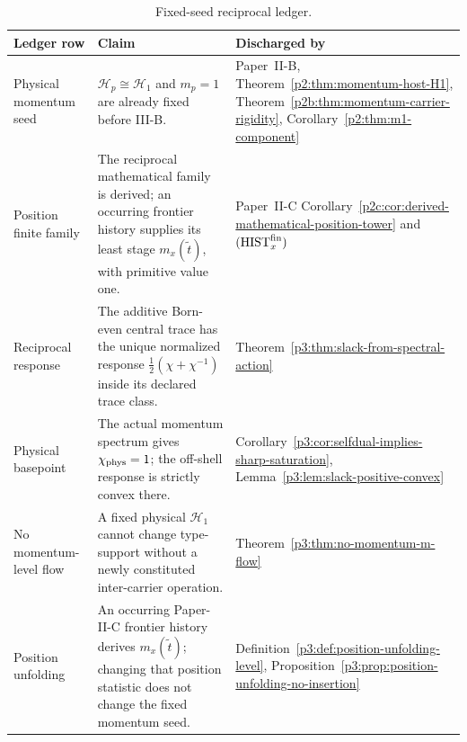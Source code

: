 \documentclass[12pt,a4paper]{article}
\begin{document}
\begin{table}[H]
\centering
\small
\begingroup
\setlength{\tabcolsep}{3pt}
\renewcommand{\arraystretch}{1.15}
\begin{tabular}{@{}L{3.0cm}L{8.0cm}L{\dimexpr\linewidth-11.0cm-4\tabcolsep\relax}@{}}
\toprule
\textbf{Ledger row}&\textbf{Claim}&\textbf{Discharged by}\\
\midrule
Physical momentum seed
& \(\mathcal H_p\cong\mathcal H_1\) and \(m_p=1\) are already fixed before III-B.
& Paper~II-B, Theorem~\ref{p2:thm:momentum-host-H1},
  Theorem~\ref{p2b:thm:momentum-carrier-rigidity},
  Corollary~\ref{p2:thm:m1-component}\\
Position finite family
& The reciprocal mathematical family is derived; an occurring frontier
history supplies its least stage \(m_x(\widetilde t)\), with primitive value
one.
& Paper~II-C
Corollary~\ref{p2c:cor:derived-mathematical-position-tower} and
\((\mathrm{HIST}_x^{\rm fin})\)\\
Reciprocal response
& The additive Born-even central trace has the unique normalized response \(\tfrac12(\chi+\chi^{-1})\) inside its declared trace class.
& Theorem~\ref{p3:thm:slack-from-spectral-action}\\
Physical basepoint
& The actual momentum spectrum gives \(\chi_{\rm phys}=1\); the off-shell response is strictly convex there.
& Corollary~\ref{p3:cor:selfdual-implies-sharp-saturation}, Lemma~\ref{p3:lem:slack-positive-convex}\\
No momentum-level flow
& A fixed physical \(\mathcal H_1\) cannot change type-support without a newly constituted inter-carrier operation.
& Theorem~\ref{p3:thm:no-momentum-m-flow}\\
Position unfolding
& An occurring Paper-II-C frontier history derives
\(m_x(\widetilde t)\); changing that position statistic does not change the
fixed momentum seed.
& Definition~\ref{p3:def:position-unfolding-level}, Proposition~\ref{p3:prop:position-unfolding-no-insertion}\\
\bottomrule
\end{tabular}
\caption[Fixed-seed reciprocal ledger]{Fixed-seed reciprocal ledger.}
\label{tab:p3-cell-momentum-ledger}
\endgroup
\end{table}
\end{document}

